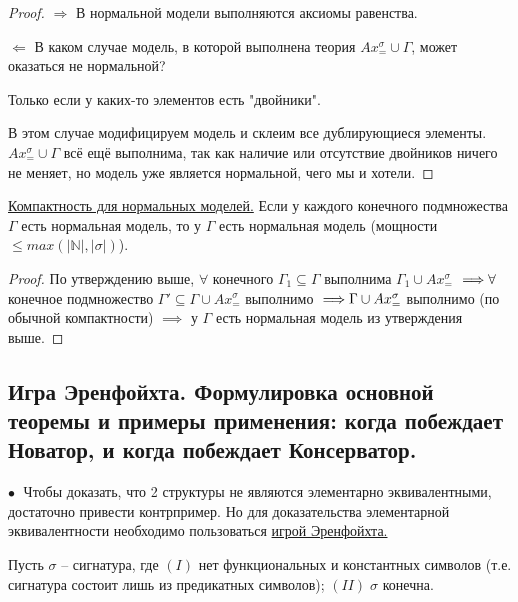 \documentclass[a4paper, fleqn]{article}
\begin{document}
    \begin{proof}
    $\boxed{\Rightarrow}$ В нормальной модели выполняются аксиомы равенства.
    
    $\boxed{\Leftarrow}$ В каком случае модель, в которой выполнена теория $Ax_{=}^{\sigma} \cup \Gamma$, может оказаться не нормальной? 
    
    Только если у каких-то элементов есть "двойники". 
    
    В этом случае модифицируем модель и склеим все дублирующиеся элементы. $Ax_{=}^{\sigma} \cup \Gamma$ всё ещё выполнима, так как наличие или отсутствие двойников ничего не меняет, но модель уже является нормальной, чего мы и хотели.
    
    \end{proof}
    
    \doublespacing \underline{Компактность для нормальных моделей.} Если у каждого конечного подмножества $\Gamma$ есть нормальная модель, то у $\Gamma$ есть нормальная модель (мощности $\leq max (|\mathbb{N}| , | \sigma| )$).
    
    \begin{proof}
    
    По утверждению выше, $\forall$ конечного $\Gamma_1 \subseteq \Gamma$ выполнима $\Gamma_1 \cup Ax_{=}^{\sigma}$  $\implies \\ 
    \forall$ конечное подмножество $ \Gamma' \subseteq \Gamma \cup Ax_{=}^{\sigma} $ выполнимо $\implies \\ \Gamma \cup Ax_{=}^{\sigma}$ выполнимо (по обычной компактности) $\implies$ у $\Gamma$ есть нормальная модель из утверждения выше.
    
    \end{proof}

    
    \subsection*{Игра Эренфойхта. Формулировка основной теоремы и примеры применения: когда побеждает Новатор, и когда побеждает Консерватор.}
    
    $\bullet \;$ Чтобы доказать, что 2 структуры не являются элементарно эквивалентными, достаточно привести контрпример. Но для доказательства элементарной эквивалентности необходимо пользоваться \underline{игрой Эренфойхта.}
    
    Пусть $\sigma $ -- сигнатура, где $(I)$ нет функциональных и константных символов (т.е. сигнатура состоит лишь из предикатных символов); $(II) \; \sigma$ конечна.
    
\end{document}
